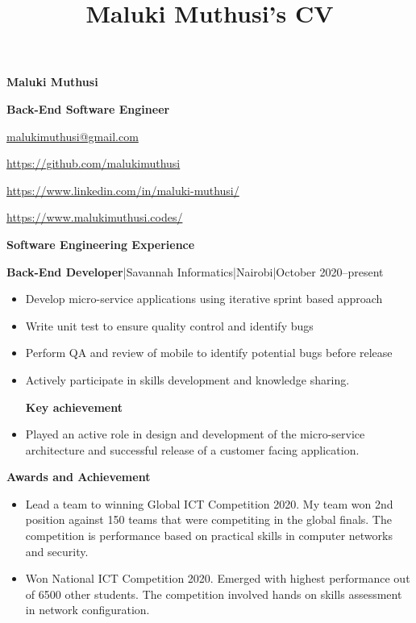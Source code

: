 \documentclass[a4paper]{article}
\begin{document}
\title{Maluki Muthusi's CV}

\begin{center}
    {\Large \textbf{Maluki Muthusi}} \par
    {\large \textbf{Back-End Software Engineer}}
\end{center}

\begin{description}[noitemsep]
    \item[\textbf{Email:}] \href{mailto:malukimuthusi@gmail.com}{malukimuthusi@gmail.com}
    \item[\textbf{Github:}] \url{https://github.com/malukimuthusi}
        \item[\textbf{LinkedIn:}]\url{https://www.linkedin.com/in/maluki-muthusi/}
        \item[\textbf{Website:}]\url{https://www.malukimuthusi.codes/}
\end{description}







\begin{center}
    {\Large \textbf{Software Engineering Experience}}
\end{center}
\textbf{Back-End Developer}|Savannah Informatics|Nairobi|October 2020--present
\begin{itemize}[noitemsep]
    \item Develop micro-service applications using iterative sprint based approach
    \item Write unit test to ensure quality control and identify bugs
    \item Perform QA and review of mobile to identify potential bugs before release
    \item Actively participate in skills development and knowledge sharing.
          \begin{center}
              \textbf{Key achievement}
          \end{center}
    \item Played an active role in design and development of the micro-service architecture and successful release of a customer facing application.
\end{itemize}

\begin{center}
    {\Large \textbf{Awards and Achievement}}
\end{center}
\begin{itemize}[noitemsep]
    \item Lead a team to winning Global ICT Competition 2020. My team won 2nd position against 150 teams that were competiting in the global finals. The competition is performance based on practical skills in computer networks and security.
    \item Won National ICT Competition 2020. Emerged with highest performance out of 6500 other students. The competition involved hands on skills assessment in network configuration.
\end{itemize}
\end{document}
